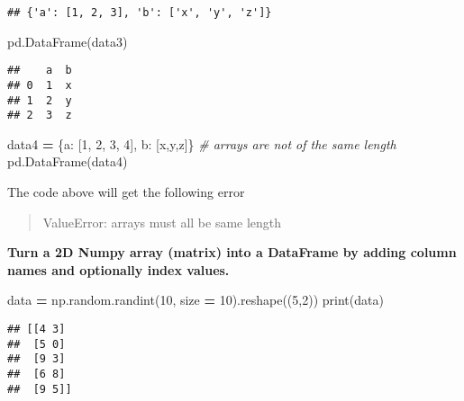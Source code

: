 \documentclass[
]{book}
\newenvironment{Shaded}{\begin{snugshade}}{\end{snugshade}}
\newcommand{\BuiltInTok}[1]{#1}
\newcommand{\CommentTok}[1]{\textcolor[rgb]{0.56,0.35,0.01}{\textit{#1}}}
\newcommand{\DecValTok}[1]{\textcolor[rgb]{0.00,0.00,0.81}{#1}}
\newcommand{\NormalTok}[1]{#1}
\newcommand{\OperatorTok}[1]{\textcolor[rgb]{0.81,0.36,0.00}{\textbf{#1}}}
\newcommand{\StringTok}[1]{\textcolor[rgb]{0.31,0.60,0.02}{#1}}
\begin{document}
\begin{verbatim}
## {'a': [1, 2, 3], 'b': ['x', 'y', 'z']}
\end{verbatim}

\begin{Shaded}
\begin{Highlighting}[]
\NormalTok{pd.DataFrame(data3)}
\end{Highlighting}
\end{Shaded}

\begin{verbatim}
##    a  b
## 0  1  x
## 1  2  y
## 2  3  z
\end{verbatim}

\begin{Shaded}
\begin{Highlighting}[]
\NormalTok{data4 }\OperatorTok{=}\NormalTok{ \{}\StringTok{\textquotesingle{}a\textquotesingle{}}\NormalTok{: [}\DecValTok{1}\NormalTok{, }\DecValTok{2}\NormalTok{, }\DecValTok{3}\NormalTok{, }\DecValTok{4}\NormalTok{], }\StringTok{\textquotesingle{}b\textquotesingle{}}\NormalTok{: [}\StringTok{\textquotesingle{}x\textquotesingle{}}\NormalTok{,}\StringTok{\textquotesingle{}y\textquotesingle{}}\NormalTok{,}\StringTok{\textquotesingle{}z\textquotesingle{}}\NormalTok{]\} }\CommentTok{\# arrays are not of the same length}
\NormalTok{pd.DataFrame(data4)}
\end{Highlighting}
\end{Shaded}

The code above will get the following error

\begin{quote}
ValueError: arrays must all be same length
\end{quote}

\textbf{Turn a 2D Numpy array (matrix) into a DataFrame by adding column names and optionally
index values.}

\begin{Shaded}
\begin{Highlighting}[]
\NormalTok{data }\OperatorTok{=}\NormalTok{ np.random.randint(}\DecValTok{10}\NormalTok{, size }\OperatorTok{=} \DecValTok{10}\NormalTok{).reshape((}\DecValTok{5}\NormalTok{,}\DecValTok{2}\NormalTok{))}
\BuiltInTok{print}\NormalTok{(data)}
\end{Highlighting}
\end{Shaded}

\begin{verbatim}
## [[4 3]
##  [5 0]
##  [9 3]
##  [6 8]
##  [9 5]]
\end{verbatim}
\end{document}

